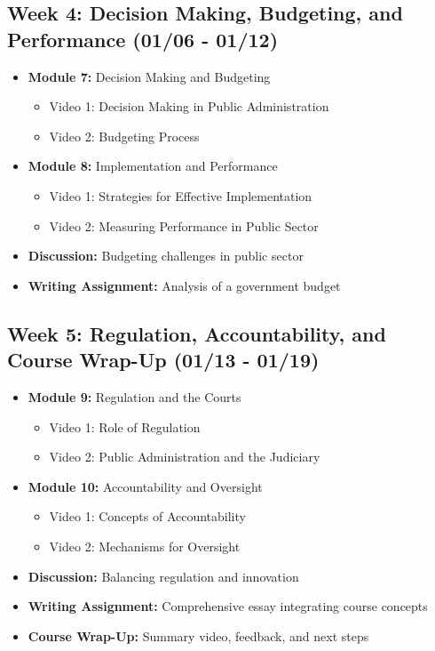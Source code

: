 \documentclass[12pt, letterpaper]{article}
\begin{document}
\subsection*{Week 4: Decision Making, Budgeting, and Performance (01/06 - 01/12)}
\begin{itemize}
    \item \textbf{Module 7:} Decision Making and Budgeting
        \begin{itemize}
            \item Video 1: Decision Making in Public Administration
            \item Video 2: Budgeting Process
        \end{itemize}
    \item \textbf{Module 8:} Implementation and Performance
        \begin{itemize}
            \item Video 1: Strategies for Effective Implementation
            \item Video 2: Measuring Performance in Public Sector
        \end{itemize}
    \item \textbf{Discussion:} Budgeting challenges in public sector
    \item \textbf{Writing Assignment:} Analysis of a government budget
\end{itemize}

\subsection*{Week 5: Regulation, Accountability, and Course Wrap-Up (01/13 - 01/19)}
\begin{itemize}
    \item \textbf{Module 9:} Regulation and the Courts
        \begin{itemize}
            \item Video 1: Role of Regulation
            \item Video 2: Public Administration and the Judiciary
        \end{itemize}
    \item \textbf{Module 10:} Accountability and Oversight
        \begin{itemize}
            \item Video 1: Concepts of Accountability
            \item Video 2: Mechanisms for Oversight
        \end{itemize}
    \item \textbf{Discussion:} Balancing regulation and innovation
    \item \textbf{Writing Assignment:} Comprehensive essay integrating course concepts
    \item \textbf{Course Wrap-Up:} Summary video, feedback, and next steps
\end{itemize}
\end{document}
